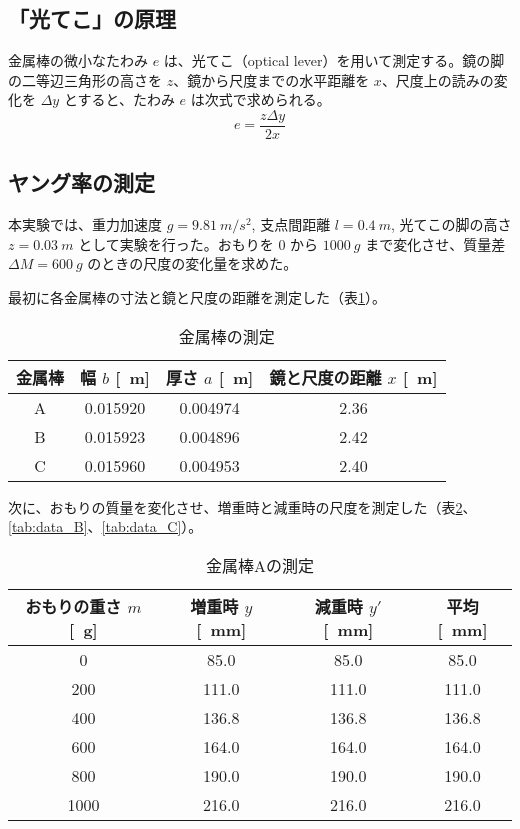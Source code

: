 \documentclass[a4paper,11pt,dvipdfmx]{jsarticle}
\begin{document}
\subsection{「光てこ」の原理}
金属棒の微小なたわみ $e$ は、光てこ（optical lever）を用いて測定する。鏡の脚の二等辺三角形の高さを $z$、鏡から尺度までの水平距離を $x$、尺度上の読みの変化を $\Delta y$ とすると、たわみ $e$ は次式で求められる。
\begin{equation}
    e = \frac{z \Delta y}{2x} \label{eq:deflection}
\end{equation}

\subsection{ヤング率の測定}
本実験では、重力加速度 $g=\SI{9.81}{m/s^2}$, 支点間距離 $l=\SI{0.4}{m}$, 光てこの脚の高さ $z=\SI{0.03}{m}$ として実験を行った。おもりを $0$ から $\SI{1000}{g}$ まで変化させ、質量差 $\Delta M = \SI{600}{g}$ のときの尺度の変化量を求めた。

最初に各金属棒の寸法と鏡と尺度の距離を測定した（表\ref{tab:dimensions}）。
\begin{table}[H]
    \centering
    \caption{金属棒の測定}
    \label{tab:dimensions}
    \begin{tabular}{cccc}
        \hline
        金属棒 & 幅 $b$ [\SI{}{m}] & 厚さ $a$ [\SI{}{m}] & 鏡と尺度の距離 $x$ [\SI{}{m}] \\
        \hline \hline
        A & \num{0.015920} & \num{0.004974} & \num{2.36} \\
        B & \num{0.015923} & \num{0.004896} & \num{2.42} \\
        C & \num{0.015960} & \num{0.004953} & \num{2.40} \\
        \hline
    \end{tabular}
\end{table}

次に、おもりの質量を変化させ、増重時と減重時の尺度を測定した（表\ref{tab:data_A}、\ref{tab:data_B}、\ref{tab:data_C}）。
\begin{table}[H]
    \centering
    \caption{金属棒Aの測定}
    \label{tab:data_A}
    \begin{tabular}{cccc}
        \hline
        おもりの重さ $m$ [\SI{}{g}] & 増重時 $y$ [\SI{}{mm}] & 減重時 $y'$ [\SI{}{mm}] & 平均 [\SI{}{mm}] \\
        \hline \hline
        0 & 85.0 & 85.0 & 85.0 \\
        200 & 111.0 & 111.0 & 111.0 \\
        400 & 136.8 & 136.8 & 136.8 \\
        600 & 164.0 & 164.0 & 164.0 \\
        800 & 190.0 & 190.0 & 190.0 \\
        1000 & 216.0 & 216.0 & 216.0 \\
        \hline
    \end{tabular}
\end{table}
\end{document}
